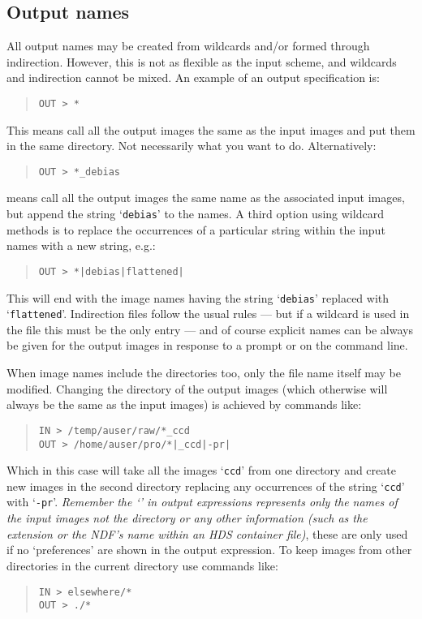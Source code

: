 \documentclass[twoside,11pt]{article}
\renewcommand{\_}{\texttt{\symbol{95}}}
\newenvironment{myquote}{\begin{quote}\begin{small}}{\end{small}\end{quote}}
\newcommand{\text}[1]{{\small \tt #1}}
\begin{document}
\subsection{Output names}

All output names may be created from wildcards and/or formed through
indirection. However, this is not as flexible as the input scheme,
and wildcards and indirection cannot be mixed. An example of an
output specification is:
\begin{myquote}
\begin{verbatim}
OUT > *
\end{verbatim}
\end{myquote}
This means call all the output images the same as the input images and put
them in the same directory.
Not necessarily what you want to do.
Alternatively:
\begin{myquote}
\begin{verbatim}
OUT > *_debias
\end{verbatim}
\end{myquote}
means call all the output images the same name as the associated
input images, but append the string `\text{\_debias}' to the names. A
third option using wildcard methods is to replace the occurrences of a
particular string within the input names with a new string, e.g.:
\begin{myquote}
\begin{verbatim}
OUT > *|debias|flattened|
\end{verbatim}
\end{myquote}
This will end with the image names having the string `\text{debias}'
replaced with `\text{flattened}'. Indirection files follow the usual
rules --- but if a wildcard is used in the file this must be the only
entry --- and of course explicit names can be always be given for the
output images in response to a prompt or on the command line.

When image names include the directories too, only the file name itself may
be modified. Changing the directory of the output images (which otherwise
will always be the same as the input images) is achieved by commands
like:
\begin{myquote}
\begin{verbatim}
IN > /temp/auser/raw/*_ccd
OUT > /home/auser/pro/*|_ccd|-pr|
\end{verbatim}
\end{myquote}
Which in this case will take all the images `\text{*\_ccd}' from one
directory and create new images in the second directory replacing any
occurrences of the string
`\text{\_ccd}' with `\text{-pr}'. {\em Remember the
`\text{*}' in output expressions represents only the names of
the input images not the directory or any other information (such as
the extension or the NDF's name within an HDS container file)}, 
these are only used if no `preferences' are shown
in the output expression. To keep images from other directories
in the current directory use commands like:
\begin{myquote}
\begin{verbatim}
IN > elsewhere/*
OUT > ./*
\end{verbatim}
\end{myquote}
\end{document}

